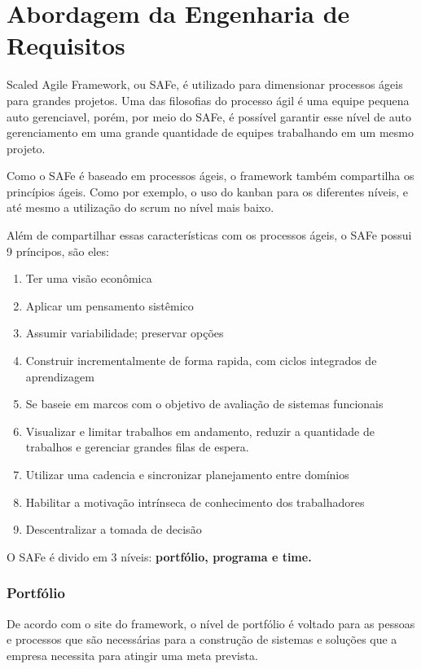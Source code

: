 \chapter{Abordagem da Engenharia de Requisitos}

  Scaled Agile Framework, ou SAFe, é utilizado para dimensionar processos ágeis para grandes projetos. Uma das filosofias do processo
  ágil é uma equipe pequena auto gerenciavel, porém, por meio do SAFe, é possível garantir esse nível de auto gerenciamento em uma
  grande quantidade de equipes trabalhando em um mesmo projeto.

  Como o SAFe é baseado em processos ágeis, o framework também compartilha os princípios ágeis. Como por exemplo, o uso do kanban para
  os diferentes níveis, e até mesmo a utilização do scrum no nível mais baixo.

  Além de compartilhar essas características com os processos ágeis, o SAFe possui 9 príncipos, são eles:

  \begin{enumerate}
    \item Ter uma visão econ\^{o}mica
    \item Aplicar um pensamento sistêmico
    \item Assumir variabilidade; preservar opções
    \item Construir incrementalmente de forma rapida, com ciclos integrados de aprendizagem
    \item Se baseie em marcos com o objetivo de avaliação de sistemas funcionais
    \item Visualizar e limitar trabalhos em andamento, reduzir a quantidade de trabalhos e gerenciar grandes filas de espera.
    \item Utilizar uma cadencia e sincronizar planejamento entre domínios
    \item Habilitar a motivação intrínseca de conhecimento dos trabalhadores
    \item Descentralizar a tomada de decisão
  \end{enumerate}

  O SAFe é divido em 3 níveis: \textbf{portfólio, programa e time.}

\subsection{Portfólio}

  De acordo com o site do framework, o nível de portfólio é voltado para as pessoas e processos que são necessárias para a construção
  de sistemas e soluções que a empresa necessita para atingir uma meta prevista.

